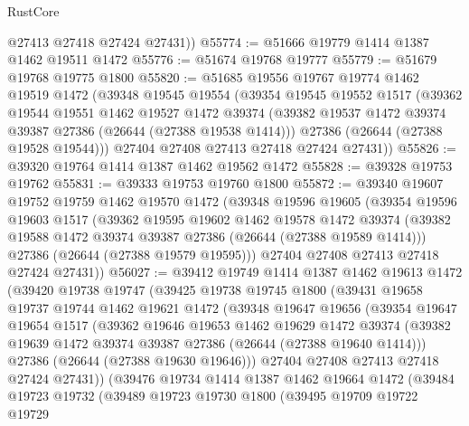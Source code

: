 \begin{lexlean}{RustCore}
\begin{coremodule}
        @27413
        @27418
        @27424
        @27431))
@55774 := @51666 @19779 @1414 @1387 @1462 @19511 @1472
@55776 := @51674 @19768 @19777
@55779 := @51679 @19768 @19775 @1800
@55820 := @51685
    @19556
    @19767
    @19774
    @1462
    @19519
    @1472
    (@39348
      @19545
      @19554
      (@39354
        @19545
        @19552
        @1517
        (@39362
          @19544
          @19551
          @1462
          @19527
          @1472
          @39374
          (@39382 @19537 @1472 @39374 @39387 @27386 (@26644 (@27388 @19538 @1414)))
          @27386
          (@26644 (@27388 @19528 @19544)))
        @27404
        @27408
        @27413
        @27418
        @27424
        @27431))
@55826 := @39320 @19764 @1414 @1387 @1462 @19562 @1472
@55828 := @39328 @19753 @19762
@55831 := @39333 @19753 @19760 @1800
@55872 := @39340
    @19607
    @19752
    @19759
    @1462
    @19570
    @1472
    (@39348
      @19596
      @19605
      (@39354
        @19596
        @19603
        @1517
        (@39362
          @19595
          @19602
          @1462
          @19578
          @1472
          @39374
          (@39382 @19588 @1472 @39374 @39387 @27386 (@26644 (@27388 @19589 @1414)))
          @27386
          (@26644 (@27388 @19579 @19595)))
        @27404
        @27408
        @27413
        @27418
        @27424
        @27431))
@56027 := @39412
    @19749
    @1414
    @1387
    @1462
    @19613
    @1472
    (@39420
      @19738
      @19747
      (@39425
        @19738
        @19745
        @1800
        (@39431
          @19658
          @19737
          @19744
          @1462
          @19621
          @1472
          (@39348
            @19647
            @19656
            (@39354
              @19647
              @19654
              @1517
              (@39362
                @19646
                @19653
                @1462
                @19629
                @1472
                @39374
                (@39382 @19639 @1472 @39374 @39387 @27386 (@26644 (@27388 @19640 @1414)))
                @27386
                (@26644 (@27388 @19630 @19646)))
              @27404
              @27408
              @27413
              @27418
              @27424
              @27431))
          (@39476
            @19734
            @1414
            @1387
            @1462
            @19664
            @1472
            (@39484
              @19723
              @19732
              (@39489
                @19723
                @19730
                @1800
                (@39495
                  @19709
                  @19722
                  @19729

\end{coremodule}
\end{lexlean}
